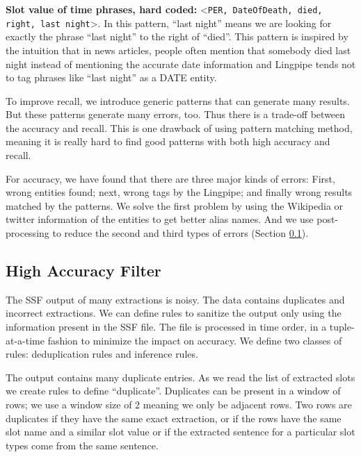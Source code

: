 \textbf{Slot value of time phrases, hard coded:} \textless \texttt{PER, DateOfDeath, died, right, 
last night}\textgreater. In this pattern, “last night'' means we are looking for 
exactly the phrase ``last night'' to the right of ``died''. This pattern is 
inspired by the intuition that in news articles, people often mention that 
somebody died last night instead of mentioning the accurate date information 
and Lingpipe tends not to tag phrases like ``last night'' as a DATE entity. 

To improve recall, we introduce generic patterns that can generate many results.
But these patterns generate many errors, too. Thus there is a trade-off 
between the accuracy and recall. This is one drawback of using pattern 
matching method, meaning it is really hard to find good patterns with both 
high accuracy and recall. 

For accuracy, we have found that there are three major kinds of errors: First,  
wrong entities found; next, wrong tags by the Lingpipe; and finally wrong results matched 
by the patterns. We solve the first problem by using the Wikipedia or twitter 
information of the entities to get better alias names. And we use
post-processing to reduce the second and third types of errors (Section \ref{section:highAccuracyFilter}).

\subsection{High Accuracy Filter}
\label{section:highAccuracyFilter}

The SSF output of many extractions is noisy. The data contains duplicates and 
incorrect extractions. We can define rules to sanitize the output only using 
the information present in the SSF file. The file is processed in time order, 
in a tuple-at-a-time fashion to minimize the impact on accuracy. We define 
two classes of rules: deduplication rules and inference rules.

The output contains many duplicate entries. As we read the list of extracted 
slots we create rules to define ``duplicate''. Duplicates can be present in a 
window of rows; we use a window size of 2 meaning we only be adjacent rows. 
Two rows are duplicates if they have the same exact extraction, or if the 
rows have the same slot name and a similar slot value or if the extracted 
sentence for a particular slot types come from the same sentence.

